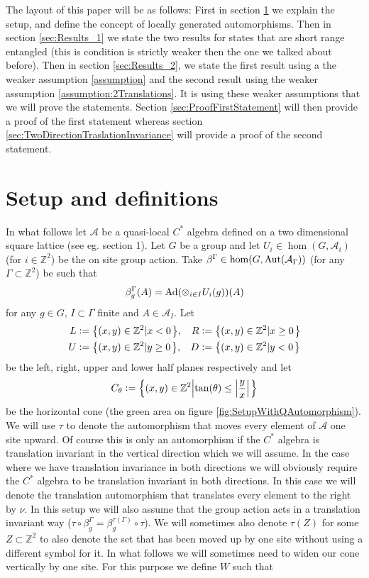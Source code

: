 \documentclass[12pt,a4paper,twoside]{article}
\newcommand{\defeq}{\vcentcolon=}
\let\originalleft\left
\let\originalright\right
\renewcommand{\left}{\mathopen{}\mathclose\bgroup\originalleft}
\renewcommand{\right}{\aftergroup\egroup\originalright}
\newcommand{\ZZ}{\mathbb Z}
\renewcommand{\AA}{\mathcal A}
\newcommand{\Ad}[1]{\textrm{Ad}\left(#1\right)}
\newcommand{\Aut}[1]{\textrm{Aut}\left(#1\right)}
\theoremstyle{definition}
\numberwithin{equation}{section}
\begin{document}
The layout of this paper will be as follows: First in section \ref{sec:Setup} we explain the setup, and define the concept of locally generated automorphisms. Then in section \ref{sec:Results_1} we state the two results for states that are short range entangled (this is condition is strictly weaker then the one we talked about before). Then in section \ref{sec:Results_2}, we state the first result using a the weaker assumption \ref{assumption} and the second result using the weaker assumption \ref{assumption:2Translations}. It is using these weaker assumptions that we will prove the statements. Section \ref{sec:ProofFirstStatement} will then provide a proof of the first statement whereas section \ref{sec:TwoDirectionTraslationInvariance} will provide a proof of the second statement.
\section{Setup and definitions}\label{sec:Setup}
In what follows let $\AA$ be a quasi-local $C^*$ algebra defined on a two dimensional square lattice (see eg. \cite{ogata2021h3gmathbb} section 1). Let $G$ be a group and let $U_i\in\hom(G,\AA_i)$ (for $i\in\ZZ^2$) be the on site group action. Take $\beta^\Gamma\in\hom(G,\Aut{\AA_\Gamma})$ (for any $\Gamma\subset\ZZ^2$) be such that
\begin{equation}
	\beta^\Gamma_g(A)=\Ad{\otimes_{i\in I} U_i(g)}(A)
\end{equation}
for any $g\in G$, $I\subset\Gamma$ finite and $A\in\AA_I$. Let
\begin{align}
	L&\defeq \left\{(x,y)\in\ZZ^2\left|x<0\right.\right\},&R&\defeq \left\{(x,y)\in\ZZ^2\left|x\geq 0\right.\right\}\\
	U&\defeq \left\{(x,y)\in\ZZ^2\left|y\geq 0\right.\right\},&D&\defeq \left\{(x,y)\in\ZZ^2\left|y<0\right.\right\}
\end{align}
be the left, right, upper and lower half planes respectively and let
\begin{equation}
	C_\theta\defeq \left\{(x,y)\in\ZZ^2\left|\tan(\theta)\leq\abs{\frac{y}{x}}\right.\right\}
\end{equation}
be the horizontal cone (the green area on figure \ref{fig:SetupWithQAutomorphism}). We will use $\tau$ to denote the automorphism that moves every element of $\AA$ one site upward. Of course this is only an automorphism if the $C^*$ algebra is translation invariant in the vertical direction which we will assume. In the case where we have translation invariance in both directions we will obviously require the $C^*$ algebra to be translation invariant in both directions. In this case we will denote the translation automorphism that translates every element to the right by $\nu$. In this setup we will also assume that the group action acts in a translation invariant way ($\tau\circ\beta_g^\Gamma=\beta_g^{\tau(\Gamma)}\circ\tau$). We will sometimes also denote $\tau(Z)$ for some $Z\subset\ZZ^2$ to also denote the set that has been moved up by one site without using a different symbol for it. In what follows we will sometimes need to widen our cone vertically by one site. For this purpose we define $W$ such that
\end{document}
